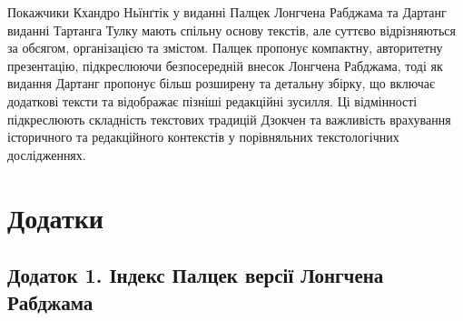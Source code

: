 \documentclass{article}
\begin{document}
Покажчики Кхандро Ньїнґтік у виданні Палцек Лонгчена Рабджама та Дартанг виданні Тартанга Тулку
мають спільну основу текстів, але суттєво відрізняються за обсягом, організацією та змістом. Палцек
пропонує компактну, авторитетну презентацію, підкреслюючи безпосередній внесок Лонгчена Рабджама,
тоді як видання Дартанг пропонує більш розширену та детальну збірку, що включає додаткові тексти
та відображає пізніші редакційні зусилля. Ці відмінності підкреслюють складність текстових традицій
Дзокчен та важливість врахування історичного та редакційного контекстів у порівняльних текстологічних дослідженнях.

\newpage

\section{Додатки}

\subsection{Додаток 1. Індекс Палцек версії Лонгчена Рабджама}
\end{document}
